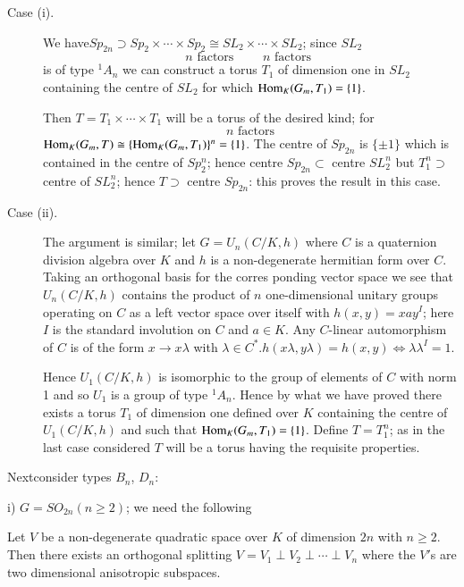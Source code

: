 \begin{description}
\item[{\rm Case (i).}]
We have\pageoriginale $Sp_{2n} \supset Sp_2 \times \cdots  \times Sp_2
\cong SL_2 \times  \cdots \times  SL_2$; since $SL_2$  
$$
n \text{ factors } \qquad n \text{ factors }
$$
is of type ${}^1 A_n$ we can construct a torus $T_1$ of dimension one in
$SL_2$ containing the centre of $SL_2$ for which $\operatorname{Hom}_K (G_m, T_1) =
\{ 1 \}$.  

\noindent
Then $T = T_1 \times  \cdots  \times  T_1$ will be a torus of the
desired kind; for  
$$
n \text{ factors}
$$
$\operatorname{Hom}_K (G_m, T) \cong \{ \operatorname{Hom}_K (G_m, T_1)\}^n = \{ 1 \}$. The centre
of $Sp_{2n}$ is $\{ \pm 1 \}$ which is contained in the centre of
$Sp^n_2$; hence centre $Sp_{2n} \subset$ centre $SL^n_2$ but $T^n_1
\supset$ centre of $SL^n_2$; hence $T \supset $ centre $Sp_{2n}$: this
proves the result in this case. 

\item[{\rm Case (ii).}]
The argument is similar; let $G =U_n (C/K,h)$ where $C$ is a
quaternion division algebra over $K$ and $h$ is a non-degenerate
hermitian form over $C$. Taking an orthogonal basis for the corres
ponding vector space we see that $U_n (C/K,h)$ contains the product of
$n$ one-dimensional unitary groups operating on $C$ as a left vector
space over itself with $h(x,y) = xay^I$; here $I$ is the standard
involution on $C$ and $a \in K$. Any $C$-linear automorphism of $C$ is
of the form $x \to x \lambda$ with $\lambda \in C^*. h(x \lambda , y
\lambda) = h(x,y) \Longleftrightarrow \lambda \lambda^I = 1$. 

Hence $U_1 (C/K,h)$ is isomorphic to the group of elements of $C$ with
norm 1 and so $U_1$ is a group of type ${}^1A_n$. Hence by what we
have proved there exists a torus $T_1$ of dimension one defined over
$K$ containing the centre of $U_1 (C/K,h)$ and such that $\Hom_K(G_m,\break
T_1) = \{ 1 \}$. Define $T= T^n_1$; as in the last case considered $T$
will be a torus having the requisite properties. 
\end{description}

Next\pageoriginale consider types $B_n$, $D_n$: 

\noindent
i) $G= SO_{2n}(n \geq 2)$; we need the following 

\begin{lem}\label{chap4:lem3}
Let $V$ be a non-degenerate quadratic space over $K$ of dimension $2n$
with $n \geq 2$. Then there exists an orthogonal splitting $V = V_1
\perp V_2 \perp \cdots \perp V_n$ where the $V'$s are two dimensional
anisotropic subspaces.  
 \end{lem} 
 
